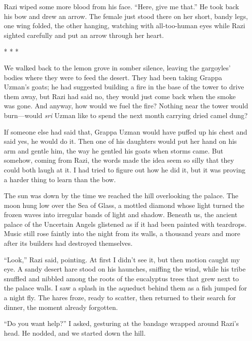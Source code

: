 Razi wiped some more blood from his face.  ``Here, give me that.''  He
took back his bow and drew an arrow.  The female just stood there on
her short, bandy legs, one wing folded, the other hanging, watching
with all-too-human eyes while Razi sighted carefully and put an arrow
through her heart.

\begin{center}* * *\end{center}

We walked back to the lemon grove in somber silence, leaving the
gargoyles' bodies where they were to feed the desert.  They had been
taking Grappa Uzman's goats; he had suggested building a fire in the
base of the tower to drive them away, but Razi had said no, they would
just come back when the smoke was gone.  And anyway, how would we fuel
the fire?  Nothing near the tower would burn---would \emph{sri} Uzman like
to spend the next month carrying dried camel dung?

If someone else had said that, Grappa Uzman would have puffed up his
chest and said yes, he would do it.  Then one of his daughters would
put her hand on his arm and gentle him, the way he gentled his goats
when storms came.  But somehow, coming from Razi, the words made the
idea seem so silly that they could both laugh at it.  I had tried to
figure out how he did it, but it was proving a harder thing to learn
than the bow.

The sun was down by the time we reached the hill overlooking the
palace.  The moon hung low over the Sea of Glass, a mottled diamond
whose light turned the frozen waves into irregular bands of light and
shadow.  Beneath us, the ancient palace of the Uncertain Angels
glistened as if it had been painted with teardrops.  Music still rose
faintly into the night from its walls, a thousand years and more after
its builders had destroyed themselves.

``Look,'' Razi said, pointing.  At first I didn't see it, but then
motion caught my eye.  A sandy desert hare stood on his haunches,
sniffing the wind, while his tribe snuffled and nibbled among the
roots of the eucalyptus trees that grew next to the palace walls.  I
saw a splash in the aqueduct behind them as a fish jumped for a night
fly.  The hares froze, ready to scatter, then returned to their search
for dinner, the moment already forgotten.

``Do you want help?'' I asked, gesturing at the bandage wrapped around
Razi's head.  He nodded, and we started down the hill.

